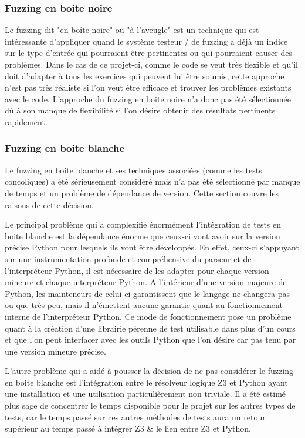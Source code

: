 \documentclass[a4paper]{report}
\begin{document}
\subsubsection{Fuzzing en boite noire}

Le fuzzing dit "en boîte noire" ou "à l'aveugle" est un technique qui est intéressante d'appliquer quand le système testeur / de fuzzing a déjà un indice sur le type d'entrée qui pourraient être pertinentes ou qui pourraient causer des problèmes.
Dans le cas de ce projet-ci, comme le code se veut très flexible et qu'il doit d'adapter à tous les exercices qui peuvent lui être soumis, cette approche n'est pas très réaliste si l'on veut être efficace et trouver les problèmes existants avec le code.
L'approche du fuzzing en boite noire n'a donc pas été sélectionnée dû à son manque de flexibilité si l'on désire obtenir des résultats pertinents rapidement.

\subsubsection{Fuzzing en boite blanche}

Le fuzzing en boite blanche et ses techniques associées (comme les tests concoliques) a été sérieusement considéré mais n'a pas été sélectionné par manque de temps et un problème de dépendance de version.
Cette section couvre les raisons de cette décision.


Le principal problème qui a complexifié énormément l'intégration de tests en boite blanche est la dépendance énorme que ceux-ci vont avoir sur la version précise Python pour lesquels ils vont être développés.
En effet, ceux-ci s'appuyant sur une instrumentation profonde et compréhensive du parseur et de l'interpréteur Python, il est nécessaire de les adapter pour chaque version mineure et chaque interpréteur Python.
A l'intérieur d'une version majeure de Python, les mainteneurs de celui-ci garantissent que le langage ne changera pas ou que très peu, mais il n'émettent aucune garantie quant au fonctionnement interne de l'interpréteur Python.
Ce mode de fonctionnement pose un problème quant à la création d'une librairie pérenne de test utilisable dans plus d'un cours et que l'on peut interfacer avec les outils Python que l'on désire car pas tenu par une version mineure précise.

L'autre problème qui a aidé à pousser la décision de ne pas considérer le fuzzing en boite blanche est l'intégration entre le résolveur logique Z3 et Python ayant une installation et une utilisation particulièrement non triviale.
Il a été estimé plus sage de concentrer le temps disponible pour le projet sur les autres types de tests, car le temps passé sur ces autres méthodes de tests aura un retour supérieur au temps passé à intégrer Z3 \& le lien entre Z3 et Python.
\end{document}
